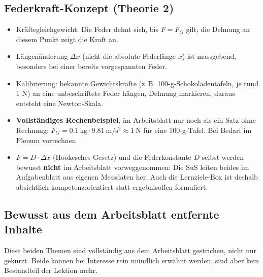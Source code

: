 \documentclass[11pt,a4paper]{article}
\begin{document}
\subsection*{Federkraft-Konzept (Theorie 2)}

\begin{itemize}[leftmargin=1.2cm,itemsep=0.3em]
  \item Kräftegleichgewicht: Die Feder dehnt sich, bis $F=F_G$ gilt; die
  Dehnung an diesem Punkt zeigt die Kraft an.
  \item Längenänderung $\Delta x$ (nicht die absolute Federlänge $x$) ist
  massgebend, besonders bei einer bereits vorgespannten Feder.
  \item Kalibrierung: bekannte Gewichtskräfte (z.\,B.
  100-g-Schokoladentafeln, je rund 1 N) an eine unbeschriftete Feder
  hängen, Dehnung markieren, daraus entsteht eine Newton-Skala.
  \item \textbf{Vollständiges Rechenbeispiel}, im Arbeitsblatt nur noch als
  ein Satz ohne Rechnung: $F_G=\SI{0.1}{\kilogram}\cdot\SI{9.81}{\meter\per\second\squared}\approx\SI{1}{\newton}$
  für eine 100-g-Tafel. Bei Bedarf im Plenum vorrechnen.
  \item $F=D\cdot\Delta x$ (Hookesches Gesetz) und die Federkonstante $D$
  selbst werden bewusst \textbf{nicht} im Arbeitsblatt vorweggenommen: Die
  SuS leiten beides im Aufgabenblatt aus eigenen Messdaten her. Auch die
  Lernziele-Box ist deshalb absichtlich kompetenzorientiert statt
  ergebnisoffen formuliert.
\end{itemize}

\subsection*{Bewusst aus dem Arbeitsblatt entfernte Inhalte}

Diese beiden Themen sind vollständig aus dem Arbeitsblatt gestrichen, nicht
nur gekürzt. Beide können bei Interesse rein mündlich erwähnt werden, sind
aber kein Bestandteil der Lektion mehr.
\end{document}
